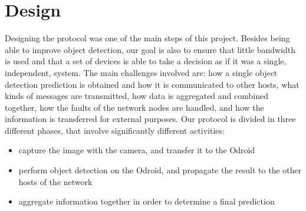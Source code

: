 \documentclass[10pt,conference,compsocconf]{IEEEtran}
\begin{document}
\section{Design}
\label{sec:design}
Designing the protocol was one of the main steps of this project. Besides being able to improve object detection, our goal is also to ensure that little bandwidth is used and that a set of devices is able to take a decision as if it was a single, independent, system. The main challenges involved are: how a single object detection prediction is obtained and how it is communicated to other hosts, what kinds of messages are transmitted, how data is aggregated and combined together, how the faults of the network nodes are handled, and how the information is transferred for external purposes.
Our protocol is divided in three different phases, that involve significantly different activities:
\begin{itemize}
\item capture the image with the camera, and transfer it to the Odroid
\item perform object detection on the Odroid, and propagate the result to the other hosts of the network
\item aggregate information together in order to determine a final prediction
\end{itemize}
\end{document}
